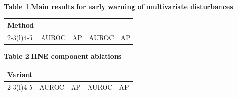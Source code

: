 \documentclass[10pt]{article}
\makeatletter
\newcommand{\sheettable}[3]{%
  {\centering\normalsize\bfseries #1\par}\vspace{6pt}%
  {\small\begin{tabular}{@{}p{.38\linewidth}*{4}{>{\centering\arraybackslash}p{.155\linewidth}}@{}}
  \toprule
  \multirow{2}{*}{#2} & \multicolumn{2}{c}{RESILIENT} & \multicolumn{2}{c}{BrisT1D-Open}\\
  \cmidrule(lr){2-3}\cmidrule(l){4-5}
  & AUROC & AP & AUROC & AP\\
  \midrule
  #3
  \bottomrule
  \end{tabular}}\par}
\makeatother
\begin{document}
\sheettable{Table 1.\enspace Main results for early warning of multivariate disturbances}{Method}{
}
\vspace{17pt}
\sheettable{Table 2.\enspace HNE component ablations}{Variant}{
}
\end{document}

